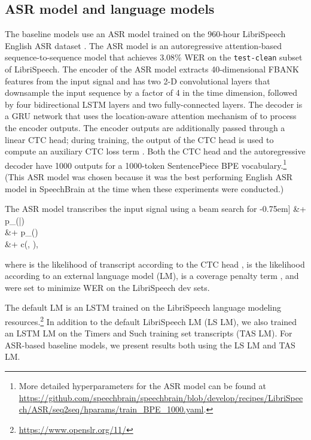 \documentclass{article}
\begin{document}
\subsection{ASR model and language models}\label{ASR}
The baseline models use an ASR model trained on the 960-hour LibriSpeech English ASR dataset \cite{librispeech}. The ASR model is an autoregressive attention-based sequence-to-sequence model \cite{bahdanau2014neural, chan2016listen} that achieves 3.08\% WER on the \texttt{test-clean} subset of LibriSpeech. The encoder of the ASR model extracts 40-dimensional FBANK features from the input signal and has two 2-D convolutional layers that downsample the input sequence by a factor of 4 in the time dimension, followed by four bidirectional LSTM layers and two fully-connected layers. The decoder is a GRU network that uses the location-aware attention mechanism of \cite{chorowski2015attention} to process the encoder outputs. The encoder outputs are additionally passed through a linear CTC \cite{Graves2006} head; during training, the output of the CTC head is used to compute an auxiliary CTC loss term \cite{kim2017joint}. Both the CTC head and the autoregressive decoder have 1000 outputs for a 1000-token SentencePiece \cite{kudo2018sentencepiece} BPE vocabulary.\footnote{More detailed hyperparameters for the ASR model can be found at \url{https://github.com/speechbrain/speechbrain/blob/develop/recipes/LibriSpeech/ASR/seq2seq/hparams/train_BPE_1000.yaml}.} (This ASR model was chosen because it was the best performing English ASR model in SpeechBrain at the time when these experiments were conducted.)

The ASR model transcribes the input signal  using a beam search for
-0.75em]
    &+ \alpha \log p_{}(|)\\
    &+ \beta \log p_{}()\\
    &+ \gamma c(, ),


where  is the likelihood of transcript   according to the CTC head \cite{kim2017joint},
 is the likelihood according to an external language model (LM),  is a coverage penalty term \cite{kannan2018analysis}, and  were set to minimize WER on the LibriSpeech dev sets.

The default LM is an LSTM trained on the LibriSpeech language modeling resources.\footnote{\url{https://www.openslr.org/11/}} In addition to the default LibriSpeech LM (LS LM), we also trained an LSTM LM on the Timers and Such training set transcripts (TAS LM). For ASR-based baseline models, we present results both using the LS LM and TAS LM.
\end{document}
